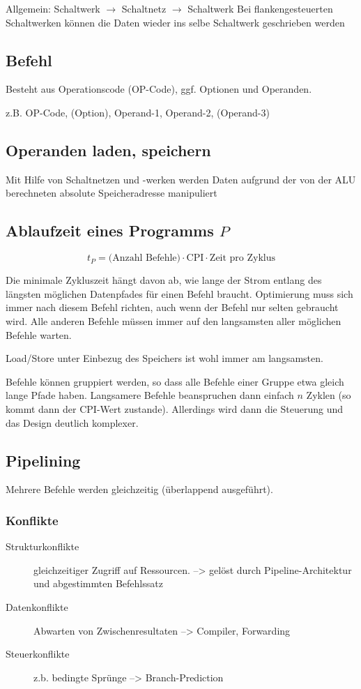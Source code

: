 Allgemein: Schaltwerk $\rightarrow$ Schaltnetz $\rightarrow$ Schaltwerk
Bei flankengesteuerten Schaltwerken können die Daten wieder ins selbe Schaltwerk geschrieben werden


\subsection{Befehl}
Besteht aus Operationscode (OP-Code), ggf. Optionen und Operanden.

z.B. OP-Code, (Option), Operand-1, Operand-2, (Operand-3) 
\subsection{Operanden laden, speichern}
Mit Hilfe von Schaltnetzen und -werken werden Daten aufgrund der von der ALU berechneten  absolute Speicheradresse manipuliert

\subsection{Ablaufzeit eines Programms $P$}
\begin{equation*}
	t_P = \mbox{(Anzahl Befehle)} \cdot \mbox{CPI} \cdot \mbox{Zeit pro Zyklus}
\end{equation*}

Die minimale Zykluszeit hängt davon ab, wie lange der Strom entlang des längsten möglichen Datenpfades für einen Befehl braucht. Optimierung muss sich immer nach diesem Befehl richten,
auch wenn der Befehl nur selten gebraucht wird. Alle anderen Befehle müssen immer auf den langsamsten aller möglichen Befehle warten.

Load/Store unter Einbezug des Speichers ist wohl immer am langsamsten.

Befehle können gruppiert werden, so dass alle Befehle einer Gruppe etwa gleich lange Pfade haben. Langsamere Befehle beanspruchen dann einfach $n$ Zyklen (so kommt dann der CPI-Wert zustande). Allerdings wird dann die Steuerung und das Design deutlich komplexer.

\subsection{Pipelining}
Mehrere Befehle werden gleichzeitig (überlappend ausgeführt).

\subsubsection{Konflikte}
\begin{description}
\item[Strukturkonflikte] gleichzeitiger Zugriff auf Ressourcen. --> gelöst durch Pipeline-Architektur und abgestimmten Befehlssatz
\item[Datenkonflikte] Abwarten von Zwischenresultaten --> Compiler, Forwarding
\item[Steuerkonflikte] z.b. bedingte Sprünge --> Branch-Prediction
\end{description}

